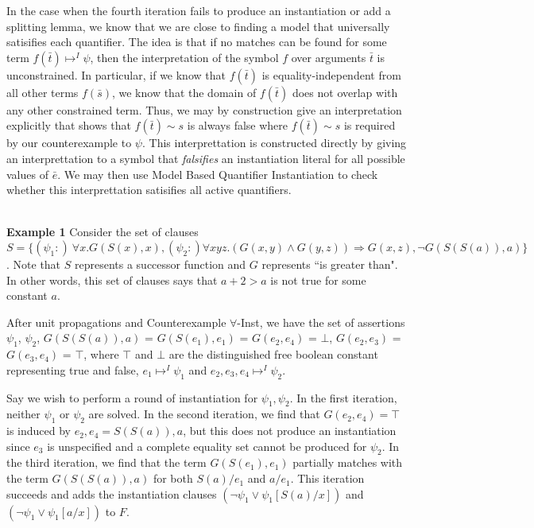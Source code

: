 \documentclass{llncs}
\begin{document}
In the case when the fourth iteration fails to produce an instantiation or add a splitting lemma, we know that we are close to finding a model that universally satisifies each quantifier.
The idea is that if no matches can be found for some term $f( \bar{t} ) \mapsto^I \psi$, then the interpretation of the symbol $f$ over arguments $\bar{t}$ is unconstrained.
In particular, if we know that $f( \bar{t} )$ is equality-independent from all other terms $f( \bar{ s } )$, we know that the domain of $f( \bar{t} )$ does not overlap with any other constrained term.
Thus, we may by construction give an interpretation explicitly that shows that $f( \bar{ t } ) \sim s$ is always false where $f( \bar{t} ) \sim s$ is required by our counterexample to $\psi$. 
This interprettation is constructed directly by giving an interprettation to a symbol that \emph{falsifies} an instantiation literal for all possible values of $\bar{e}$.
We may then use Model Based Quantifier Instantiation to check whether this interprettation satisifies all active quantifiers.

\ \\

{\bf Example 1}
Consider the set of clauses $S = \{ (\psi_1 :) \ \forall x. G( S( x ), x), (\psi_2 :) \forall xyz. (G(x,y) \wedge G(y,z)) \Rightarrow G(x,z), \neg G( S(S(a)), a) \}$.
Note that $S$ represents a successor function and $G$ represents ``is greater than".  
In other words, this set of clauses says that $a + 2 > a$ is not true for some constant $a$.

After unit propagations and Counterexample $\forall$-Inst, we have the set of assertions $\psi_1$, $\psi_2$, $G( S(S(a)), a)$ = $G( S(e_1), e_1)$ = $G( e_2, e_4 )$ = $\bot$, $G( e_2, e_3 )$ = $G( e_3, e_4 )$ = $\top$, where $\top$ and $\bot$ are the distinguished free boolean constant representing true and false, $e_1 \mapsto^I \psi_1$ and $e_2, e_3, e_4 \mapsto^I \psi_2$.

Say we wish to perform a round of instantiation for $\psi_1, \psi_2$.
In the first iteration, neither $\psi_1$ or $\psi_2$ are solved.
In the second iteration, we find that $G( e_2, e_4 ) = \top$ is induced by $e_2, e_4 = S(S(a)), a$, but this does not produce an instantiation since $e_3$ is unspecified and a complete equality set cannot be produced for $\psi_2$.
In the third iteration, we find that the term $G( S(e_1), e_1)$ partially matches with the term $G( S(S(a)), a)$ for both $S(a)/e_1$ and $a/e_1$.
This iteration succeeds and adds the instantiation clauses $( \neg \psi_1 \vee \psi_1[S(a)/x])$ and $( \neg \psi_1 \vee \psi_1[a/x])$ to $F$.
\end{document}
